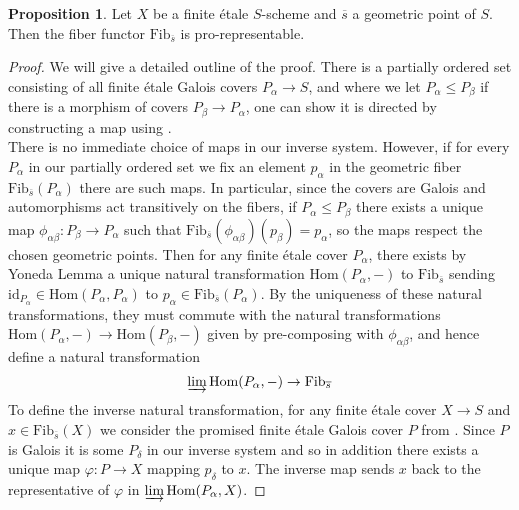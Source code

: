 \documentclass{article}
\theoremstyle{definition}
\newtheorem{proposition}[theorem]{Proposition}
\theoremstyle{remark}
\begin{document}
\begin{proposition}
	Let $X$ be a finite \'etale $S$-scheme and $\overline{s}$ a geometric point of $S$.
	Then the fiber functor $\text{Fib}_{\overline{s}}$ is pro-representable.
\end{proposition}

\begin{proof}
	We will give a detailed outline of the proof.
	There is a partially ordered set consisting of all finite \'etale Galois covers $P_{\alpha} \to S$, and where we let $P_{\alpha} \leq P_{\beta}$ if there is a morphism of covers $P_{\beta} \to P_{\alpha}$, one can show it is directed by constructing a map using .\\
	\indent There is no immediate choice of maps in our inverse system.
	However, if for every $P_{\alpha}$ in our partially ordered set we fix an element $p_{\alpha}$ in the geometric fiber $\text{Fib}_{\overline{s}}(P_{\alpha})$ there are such maps.
	In particular, since the covers are Galois and automorphisms act transitively on the fibers, if $P_{\alpha} \leq P_{\beta}$ there exists a unique map $\phi_{\alpha \beta}: P_{\beta} \to P_{\alpha}$ such that $\text{Fib}_{\overline{s}}(\phi_{\alpha \beta})(p_{\beta}) = p_{\alpha}$, so the maps respect the chosen geometric points.
	Then for any finite \'etale cover $P_{\alpha}$, there exists by Yoneda Lemma a unique natural transformation $\text{Hom}(P_{\alpha}, -)$ to $\text{Fib}_{\overline{s}}$ sending $\text{id}_{P_{\alpha}} \in \text{Hom}(P_{\alpha}, P_{\alpha})$ to $p_{\alpha} \in \text{Fib}_{\overline{s}}(P_{\alpha})$.
	By the uniqueness of these natural transformations, they must commute with the natural transformations $\text{Hom}(P_{\alpha}, -) \to \text{Hom}(P_{\beta}, -)$ given by pre-composing with $\phi_{\alpha \beta}$, and hence define a natural transformation
	\[\varinjlim \text{Hom}(P_{\alpha}, -) \to \text{Fib}_{\overline{s}}\]
	To define the inverse natural transformation, for any finite \'etale cover $X \to S$ and $x \in \text{Fib}_{\overline{s}}(X)$ we consider the promised finite \'etale Galois cover $P$ from .
	Since $P$ is Galois it is some $P_{\delta}$ in our inverse system and so in addition there exists a unique map $\varphi: P \to X$ mapping $p_{\delta}$ to $x$.
The inverse map sends $x$ back to the representative of $\varphi$ in $\varinjlim \text{Hom}(P_{\alpha}, X)$.

\end{proof}
\end{document}
